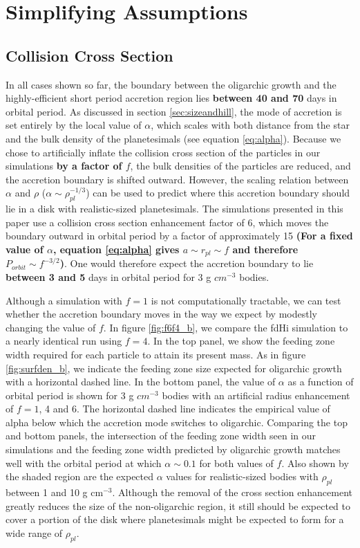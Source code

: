 \documentclass[twocolumn,linenumbers]{aastex63}
\begin{document}
\section{Simplifying Assumptions}\label{sec:assump}

\subsection{Collision Cross Section}

In all cases shown so far, the boundary between the
oligarchic growth and the highly-efficient short period accretion
region lies \textbf{between 40 and 70} days in orbital period. As discussed in section \ref{sec:sizeandhill}, the mode of accretion is
set entirely by the local value of $\alpha$, which scales with both
distance from the star and the bulk density of the planetesimals (see
equation \ref{eq:alpha}). Because we chose to artificially inflate the
collision cross section of the particles in our simulations \textbf{by a factor of $f$}, the bulk densities
of the particles are reduced, and the accretion boundary is shifted outward.
However, the scaling relation between $\alpha$ and $\rho$ ($\alpha \sim \rho_{pl}^{-1/3}$) can be used
to predict where this accretion boundary should lie in a disk with realistic-sized planetesimals. The simulations
presented in this paper use a collision cross section enhancement factor of 6, which moves the boundary outward in orbital
period by a factor of approximately 15 \textbf{(For a fixed value of $\alpha$, equation \ref{eq:alpha} gives $a \sim r_{pl} \sim f$ and therefore $P_{orbit} \sim f^{-3/2}$)}. One would therefore expect the accretion boundary to lie \textbf{between 3 and 5} days in orbital period
for 3 g $cm^{-3}$ bodies.

Although a simulation with $f=1$ is not computationally tractable, we
can test whether the accretion boundary moves in the way we expect by
modestly changing the value of $f$. In figure \ref{fig:f6f4_b}, we
compare the fdHi simulation to a nearly identical run using $f=4$. In
the top panel, we show the feeding zone width required for each particle to
attain its present mass. As in figure \ref{fig:surfden_b}, we indicate the feeding
zone size expected for oligarchic growth with a horizontal dashed line. In the bottom panel, the value
of $\alpha$ as a function of orbital period is shown for 3 g $cm^{-3}$
bodies with an artificial radius enhancement of $f=1$, 4 and 6. The
horizontal dashed line indicates the empirical value of alpha below which the
accretion mode switches to oligarchic. Comparing the top and
bottom panels, the intersection of the feeding zone width seen in our simulations and the
feeding zone width predicted by oligarchic growth matches well with the orbital period at which $\alpha
\sim 0.1$ for both values of $f$.  Also shown by the shaded region are the expected $\alpha$ values for
realistic-sized bodies with $\rho_{pl}$ between 1 and 10 g cm$^{-3}$. Although the removal of the cross section
enhancement greatly reduces the size of the non-oligarchic region, it still should be expected to cover a portion of the
disk where planetesimals might be expected to form \textbf{\citep{mulders18}} for a wide range of $\rho_{pl}$.
\end{document}
